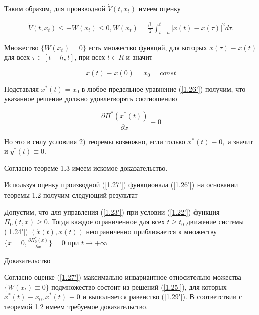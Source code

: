 Таким образом, для производной $\dot V(t, x_t)$ имеем оценку

\begin{equation} \label{1.27'}
	\begin{array}{c}
	\displaystyle \dot V(t, x_t) \le - W(x_t) \le 0, W(x_t) = \frac{\beta_0}{2} \int_{t - h}^{t} \left| x(t) - x(\tau) \right| ^ 2 d \tau.
	\end{array}
\end{equation}

Множество $\{ W(x_t) = 0 \}$ есть множество функций, для которых $x(\tau) \equiv x(t)$ для всех $\tau \in [t - h, t]$, при всех $t \in R$ и значит 

\begin{equation} \label{1.28'}
x(t) \equiv x(0) = x_0 = const
\end{equation}

Подставляя $x^{*}(t) = x_0$ в любое предельное уравнение (\ref{1.26'}) получим, что указанное решение должно удовлетворять соотношению 

\begin{equation} \label{1.29'}
\frac{\partial \Pi^{*} (x^{*} (t))}{\partial x} \equiv 0
\end{equation}

Но это в силу условиия 2) теоремы возможно, если только $x^{*} (t) \equiv 0,$ а значит и $y^{*}(t) \equiv 0.$

Согласно теореме 1.3 имеем искомое доказательство.

Используя оценку производной (\ref{1.27'}) функционала (\ref{1.26'}) на основании теоремы 1.2 получим следующий результат

\begin{theorem}\label{t-1.7}
Допустим, что для управления (\ref{1.23'}) при условии (\ref{1.22'}) функция $\Pi_0 (t, x) \ge 0$. Тогда каждое ограниченное для всех $t \ge t_0$ движение системы (\ref{1.24'}) $(\dot x(t), x(t))$ неограниченно приближается к множеству $\lbrace \dot x = 0, \frac{\partial \Pi_0^{*} (x)}{\partial x} \rbrace = 0$ при $t \to + \infty$
\end{theorem}

Доказательство

Согласно оценке (\ref{1.27'}) максимально инвариантное относительно можества $\{ W(x_t) \equiv 0 \}$ подмножество состоит из решений (\ref{1.25'}), для которых $x^{*} (t) \equiv x_0, \dot x^{*}(t) \equiv 0$ и выполняется равенство (\ref{1.29'}). В соответствии с теоремой 1.2 имеем требуемое доказательство.

